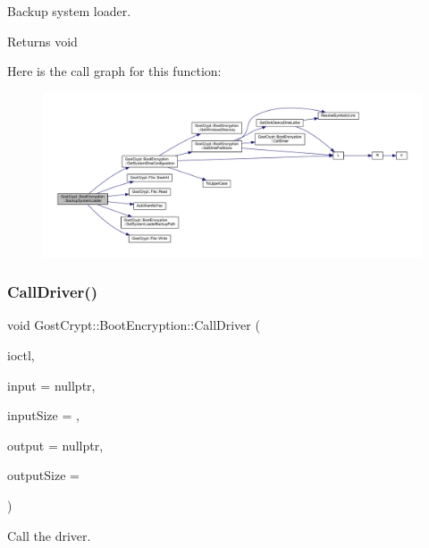 Backup system loader. 

\begin{DoxyReturn}{Returns}
void 
\end{DoxyReturn}
Here is the call graph for this function\+:
\nopagebreak
\begin{figure}[H]
\begin{center}
\leavevmode
\includegraphics[width=350pt]{class_gost_crypt_1_1_boot_encryption_a056b478fceb4e43f9492b9af91cc22c9_cgraph}
\end{center}
\end{figure}
\mbox{\label{class_gost_crypt_1_1_boot_encryption_a7f8882a862c69d803f2af4d021329e97}} 
\subsubsection{\texorpdfstring{Call\+Driver()}{CallDriver()}}
{\footnotesize\ttfamily void Gost\+Crypt\+::\+Boot\+Encryption\+::\+Call\+Driver (\begin{DoxyParamCaption}\item[{D\+W\+O\+RD}]{ioctl,  }\item[{void $\ast$}]{input = {\ttfamily nullptr},  }\item[{D\+W\+O\+RD}]{input\+Size = {},  }\item[{void $\ast$}]{output = {\ttfamily nullptr},  }\item[{D\+W\+O\+RD}]{output\+Size = {} }\end{DoxyParamCaption})}



Call the driver. 


